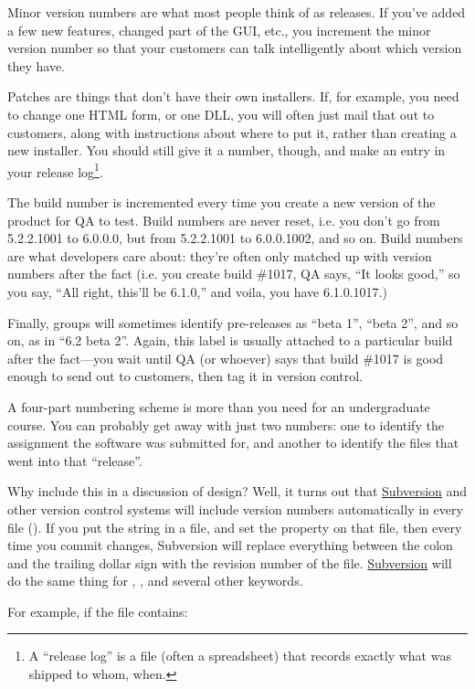 \documentclass{report}
\begin{document}
Minor version numbers are what most people think of as releases.  If
you've added a few new features, changed part of the GUI, etc., you
increment the minor version number so that your customers can talk
intelligently about which version they have.

Patches are things that don't have their own installers.  If, for
example, you need to change one HTML form, or one DLL, you will often
just mail that out to customers, along with instructions about where
to put it, rather than creating a new installer.  You should still
give it a number, though, and make an entry in your release
log\footnote{A ``release log'' is a file (often a spreadsheet) that
records exactly what was shipped to whom, when.}.

The build number is incremented every time you create a new version of
the product for QA to test.  Build numbers are never reset, i.e. you
don't go from 5.2.2.1001 to 6.0.0.0, but from 5.2.2.1001 to
6.0.0.1002, and so on.  Build numbers are what developers care about:
they're often only matched up with version numbers after the fact
(i.e.  you create build \#1017, QA says, ``It looks good,'' so you
say, ``All right, this'll be 6.1.0,'' and voila, you have 6.1.0.1017.)

Finally, groups will sometimes identify pre-releases as ``beta 1'',
``beta 2'', and so on, as in ``6.2 beta 2''.  Again, this label is
usually attached to a particular build after the fact---you wait until
QA (or whoever) says that build \#1017 is good enough to send out to
customers, then tag it in version control.

A four-part numbering scheme is more than you need for an
undergraduate course.  You can probably get away with just two
numbers: one to identify the assignment the software was submitted
for, and another to identify the files that went into that
``release''.

Why include this in a discussion of design?  Well, it turns out that
\url{Subversion} and other version control systems will include
version numbers automatically in every file
().  If you put the string
 in a file, and set the 
property on that file, then every time you commit changes, Subversion
will replace everything between the colon and the trailing dollar sign
with the revision number of the file.  \url{Subversion} will do the
same thing for , , and several other keywords.

For example, if the file contains:
\end{document}
